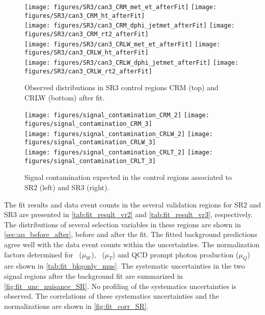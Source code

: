  \begin{figure}[ph!]
  \begin{center}
    \texttt{[image: figures/SR3/can3\_CRM\_met\_et\_afterFit]}
    \texttt{[image: figures/SR3/can3\_CRM\_ht\_afterFit]} \\
    \texttt{[image: figures/SR3/can3\_CRM\_dphi\_jetmet\_afterFit]}
    \texttt{[image: figures/SR3/can3\_CRM\_rt2\_afterFit]} \\
    \texttt{[image: figures/SR3/can3\_CRLW\_met\_et\_afterFit]}
    \texttt{[image: figures/SR3/can3\_CRLW\_ht\_afterFit]} \\
    \texttt{[image: figures/SR3/can3\_CRLW\_dphi\_jetmet\_afterFit]}
    \texttt{[image: figures/SR3/can3\_CRLW\_rt2\_afterFit]} \\
    \caption{Observed distributions in SR3 control regions CRM (top) and CRLW (bottom) after fit.}
    \label{fig:bkgfit_CR3_after}
  \end{center}
\end{figure}

\begin{figure}[ht!]
  \begin{center}
     \texttt{[image: figures/signal\_contamination\_CRM\_2]}
     \texttt{[image: figures/signal\_contamination\_CRM\_3]} \\
     \texttt{[image: figures/signal\_contamination\_CRLW\_2]}
     \texttt{[image: figures/signal\_contamination\_CRLW\_3]} \\
     \texttt{[image: figures/signal\_contamination\_CRLT\_2]}
     \texttt{[image: figures/signal\_contamination\_CRLT\_3]} \\
     \caption{Signal contamination expected in the control regions associated to SR2 (left) and SR3 (right).}
     \label{fig:sig_CR}
  \end{center}
\end{figure}

The fit results and data event counts in the several validation regions for SR2 and SR3 are presented in \Tab \ref{tab:fit_result_vr2} and \ref{tab:fit_result_vr3}, respectively. The distributions of several selection variables in these regions are shown in \App \ref{sec:ap_before_after}, before and after the fit. The fitted background predictions agree well with the data event counts within the uncertainties. The normalization factors determined for \wgamma\ ($\mu_{W}$), \ttbargam\ ($\mu_{T}$) and QCD prompt photon production ($\mu_{Q}$) are shown in \Tab \ref{tab:fit_bkgonly_mus}. %
The systematic uncertainties in the two signal regions  after the background fit are summarized in \Fig \ref{fig:fit_unc_nuisance_SR}. No profiling of the systematics uncertainties is observed. %
The correlations of these systematics uncertainties and the normalizations are shown in \Fig \ref{fig:fit_corr_SR}. %

